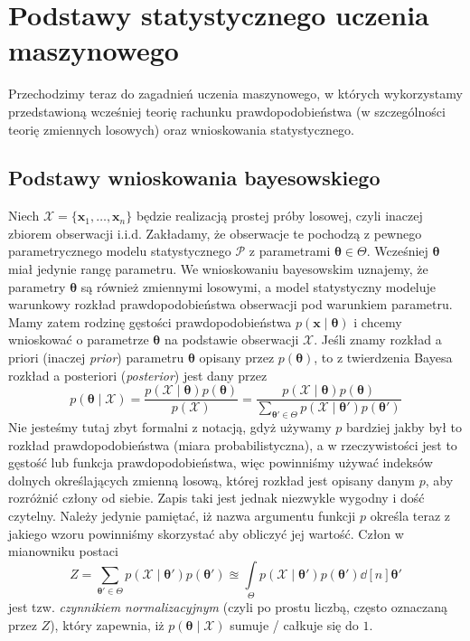 \documentclass{myclass}
\numberwithin{equation}{subsection}
\begin{document}
\section{Podstawy statystycznego uczenia maszynowego}

Przechodzimy teraz do zagadnień uczenia maszynowego, w których wykorzystamy przedstawioną wcześniej
teorię rachunku prawdopodobieństwa (w szczególności teorię zmiennych losowych) oraz wnioskowania
statystycznego.


\subsection{Podstawy wnioskowania bayesowskiego}

Niech \(\mathcal{X} = \{\bm{x}_1,\ldots,\bm{x}_n\}\) będzie realizacją prostej próby losowej, czyli
inaczej zbiorem obserwacji i.i.d. Zakładamy, że obserwacje te pochodzą z pewnego parametrycznego
modelu statystycznego \(\mathcal{P}\) z parametrami \(\bm{\theta} \in \Theta\). Wcześniej
\(\bm{\theta}\) miał jedynie rangę parametru. We wnioskowaniu bayesowskim uznajemy, że parametry
\(\bm{\theta}\) są również zmiennymi losowymi, a model statystyczny modeluje warunkowy rozkład
prawdopodobieństwa obserwacji pod warunkiem parametru. Mamy zatem rodzinę gęstości
prawdopodobieństwa \(p(\bm{x} \mid \bm{\theta})\) i chcemy wnioskować o parametrze \(\bm{\theta}\)
na podstawie obserwacji \(\mathcal{X}\). Jeśli znamy rozkład a priori (inaczej \emph{prior})
parametru \(\bm{\theta}\) opisany przez \(p(\bm{\theta})\), to z twierdzenia Bayesa rozkład a
posteriori (\emph{posterior}) jest dany przez
\begin{equation}
    p(\bm{\theta} \mid \mathcal{X}) = \frac{p(\mathcal{X} \mid \bm{\theta}) p(\bm{\theta})}{p(\mathcal{X})} = \frac{p(\mathcal{X} \mid \bm{\theta}) p(\bm{\theta})}{\sum_{\bm{\theta}' \in \Theta} p(\mathcal{X} \mid \bm{\theta}') p(\bm{\theta}')}
\end{equation}
Nie jesteśmy tutaj zbyt formalni z notacją, gdyż używamy \(p\) bardziej jakby był to rozkład
prawdopodobieństwa (miara probabilistyczna), a w rzeczywistości jest to gęstość lub funkcja
prawdopodobieństwa, więc powinniśmy używać indeksów dolnych określających zmienną losową, której
rozkład jest opisany danym \(p\), aby rozróżnić człony od siebie. Zapis taki jest jednak niezwykle
wygodny i dość czytelny. Należy jedynie pamiętać, iż nazwa argumentu funkcji \(p\) określa teraz z
jakiego wzoru powinniśmy skorzystać aby obliczyć jej wartość. Człon w mianowniku postaci
\begin{equation}
     Z = \sum_{\bm{\theta}' \in \Theta} p(\mathcal{X} \mid \bm{\theta}') p (\bm{\theta}') \approxeq \int\limits_\Theta p(\mathcal{X} \mid \bm{\theta}') p (\bm{\theta}') \dd[n]{\bm{\theta}'}
\end{equation}
jest tzw. \emph{czynnikiem normalizacyjnym} (czyli po prostu liczbą, często oznaczaną przez \(Z\)),
który zapewnia, iż \(p(\bm{\theta} \mid \mathcal{X})\) sumuje / całkuje się do \(1\).
\end{document}
